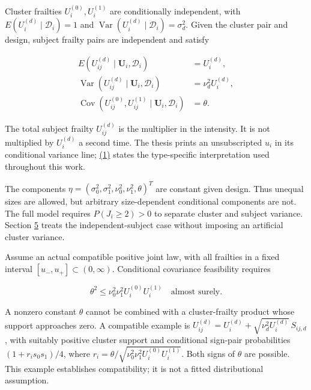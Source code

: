 \documentclass[11pt]{article}
\begin{document}
Cluster frailties \(U_i^{(0)},U_i^{(1)}\) are conditionally independent, with
\(E(U_i^{(d)}\mid\mathcal D_i)=1\) and
\(\operatorname{Var}(U_i^{(d)}\mid\mathcal D_i)=\sigma_d^2\).
Given the cluster pair and design, subject frailty pairs are independent and satisfy

\begin{equation*}
\begin{aligned}
E(U_{ij}^{(d)}\mid\mathbf U_i,\mathcal D_i)&=U_i^{(d)},\\
\operatorname{Var}(U_{ij}^{(d)}\mid\mathbf U_i,\mathcal D_i)&=\nu_d^2U_i^{(d)},\\
\operatorname{Cov}(U_{ij}^{(0)},U_{ij}^{(1)}\mid\mathbf U_i,\mathcal D_i)&=\theta.
\end{aligned}\tag{1}\label{eq:1}
\end{equation*}

The total subject frailty \(U_{ij}^{(d)}\) is the multiplier in the intensity. It is not multiplied by \(U_i^{(d)}\) a second time. The thesis prints an unsubscripted \(u_i\) in its conditional variance line; \hyperref[eq:1]{(1)} states the type-specific interpretation used throughout this work.

The components \(\eta=(\sigma_0^2,\sigma_1^2,\nu_0^2,\nu_1^2,\theta)^T\) are constant given design. Thus unequal sizes are allowed, but arbitrary size-dependent conditional components are not. The full model requires \(P(J_i\geq2)>0\) to separate cluster and subject variance. Section \hyperref[sec:5]{5} treats the independent-subject case without imposing an artificial cluster variance.

Assume an actual compatible positive joint law, with all frailties in a fixed interval \([u_-,u_+]\subset(0,\infty)\). Conditional covariance feasibility requires

\begin{equation*}
\theta^2\leq \nu_0^2\nu_1^2U_i^{(0)}U_i^{(1)}
\quad\text{almost surely}.\tag{2}\label{eq:2}
\end{equation*}

A nonzero constant \(\theta\) cannot be combined with a cluster-frailty product whose support approaches zero. A compatible example is
\(U_{ij}^{(d)}=U_i^{(d)}+\sqrt{\nu_d^2U_i^{(d)}}\,S_{ij,d}\),
with suitably positive cluster support and conditional sign-pair probabilities
\((1+r_i s_0s_1)/4\), where
\(r_i=\theta/\sqrt{\nu_0^2\nu_1^2U_i^{(0)}U_i^{(1)}}\).
Both signs of \(\theta\) are possible. This example establishes compatibility; it is not a fitted distributional assumption.
\end{document}
